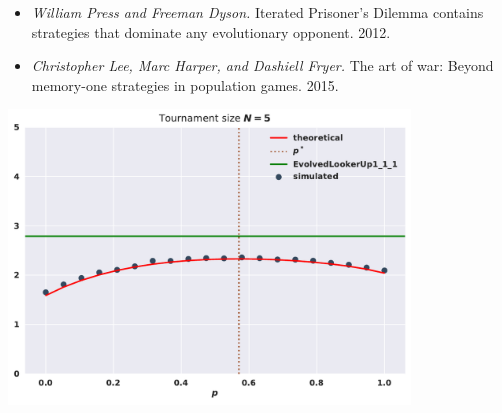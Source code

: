 \documentclass{beamer}
\begin{document}
\begin{frame}
\begin{center}
    
\end{center}
\end{frame}

\begin{frame}
    \begin{center}
       \begin{itemize}
        \item \textit{William Press and Freeman Dyson.} Iterated Prisoner’s
        Dilemma contains strategies that dominate any evolutionary opponent. 2012.
        \item  \textit{Christopher Lee, Marc Harper, and Dashiell Fryer.}
               The art of war: Beyond memory-one strategies in population games. 2015.
        \end{itemize}
    \end{center}
\end{frame}

\begin{frame}
    \begin{center}
        \includegraphics[width=0.8\textwidth]{static/optimisation.pdf}
    \end{center}
\end{frame}
\end{document}
